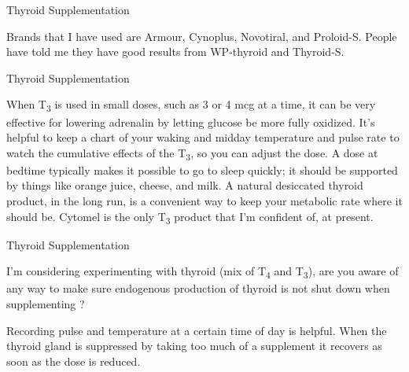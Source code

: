 \documentclass[11pt,oneside,openany,extrafontsizes]{memoir}
\begin{document}
\begin{standalonequote}{Thyroid Supplementation}

    \begin{answer}
      Brands that I have used are Armour, Cynoplus, Novotiral, and Proloid-S. People have told me they have good results from WP-thyroid and Thyroid-S.
    \end{answer}
\end{standalonequote}

\begin{standalonequote}{Thyroid Supplementation}

    \begin{answer}
      When T\textsubscript{3} is used in small doses, such as 3 or 4 mcg at a time, it can be very effective for lowering adrenalin by letting glucose be more fully oxidized. It's helpful to keep a chart of your waking and midday temperature and pulse rate to watch the cumulative effects of the T\textsubscript{3}, so you can adjust the dose. A dose at bedtime typically makes it possible to go to sleep quickly; it should be supported by things like orange juice, cheese, and milk. A natural desiccated thyroid product, in the long run, is a convenient way to keep your metabolic rate where it should be. Cytomel is the only T\textsubscript{3} product that I'm confident of, at present.
    \end{answer}
\end{standalonequote}

\begin{qaexchange}{Thyroid Supplementation}

    \begin{question}
         I'm considering experimenting with thyroid (mix of T\textsubscript{4} and T\textsubscript{3}), are you aware of any way to make sure endogenous production of thyroid is not shut down when supplementing ? 
    \end{question}

    \begin{answer}
       Recording pulse and temperature at a certain time of day is helpful. When the thyroid gland is suppressed by taking too much of a supplement it recovers as soon as the dose is reduced. 
    \end{answer}
\end{qaexchange}
\end{document}
